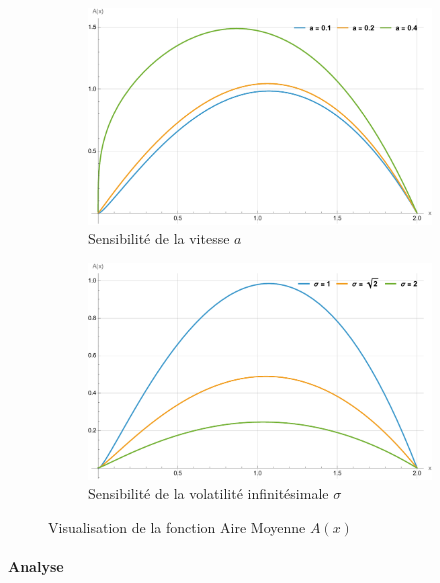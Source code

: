 \begin{figure}[htb]
    \centering
    \begin{subfigure}{0.49\linewidth}
        \includegraphics[width=\linewidth]{img/validation/Area/area_a.pdf}
        \caption{Sensibilité de la vitesse $a$}\label{fig:Area_a_visualisation}
    \end{subfigure}
    \hfill
    \begin{subfigure}{0.49\linewidth}
        \includegraphics[width=\linewidth]{img/validation/Area/area_sigma.pdf}
        \caption{Sensibilité de la volatilité infinitésimale $\sigma$}\label{fig:Area_sigma_visualisation}
    \end{subfigure}
    \caption{Visualisation de la fonction Aire Moyenne $A(x)$}\label{fig:AreaVisualisation}
\end{figure}
\FloatBarrier\paragraph{Analyse}\phantom{}\\

